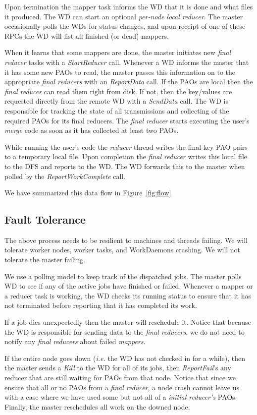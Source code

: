 \documentclass[10pt,letter,final,article,twocolumn]{article} %
\newcommand{\rpc}[1]{\emph{#1}}
\begin{document}
Upon termination the mapper task informs the WD that it is done and what files it produced. The WD can start an optional \emph{per-node local reducer}. The master occasionally polls the WDs for status changes, and upon receipt of one of these RPCs the WD will list all finished (or dead) mappers. 

When it learns that some mappers are done, the master initiates new \emph{final reducer} tasks with a \rpc{StartReducer} call. Whenever a WD informs the master that it has some new PAOs to read, the master passes this information on to the appropriate \emph{final reducers} with an \rpc{ReportData} call. If the PAOs  are local then the \emph{final reducer} can read them right from disk. If not, then the key/values are requested directly from the remote WD with a \rpc{SendData} call. The WD is responsible for tracking the state of all transmissions and collecting of the required PAOs for its final reducers. The \emph{final reducer} starts executing the user's \emph{merge} code as soon as it has collected at least two PAOs.

While running the user's code the \emph{reducer} thread writes the final key-PAO pairs to a temporary local file. Upon completion the \emph{final reducer} writes this local file to the DFS and reports to the WD. The WD forwards this to the master when polled by the \rpc{ReportWorkComplete} call.

We have summarized this data flow in Figure~\ref{fig:flow}

\subsection{Fault Tolerance}
The above process needs to be resilient to machines and threads failing. We will tolerate worker nodes, worker tasks, and WorkDaemons crashing. We will not tolerate the master failing.

We use a polling model to keep track of the dispatched jobs. The master polls WD to see if any of the active jobs have finished or failed. Whenever a mapper or a reducer task is working, the WD checks its running status to ensure that it has not terminated before reporting that it has completed its work.

If a job dies unexpectedly then the master will reschedule it. Notice that because the WD is responsible for sending data to the \emph{final reducers}, we do not need to notify any \emph{final reducers} about failed \emph{mappers}. 

If the entire node goes down (\textit{i.e.} the WD has not checked in for a while), then the master sends a \rpc{Kill} to the WD for all of its jobs, then \rpc{ReportFail}'s any reducer that are still waiting for PAOs from that node. Notice that since we ensure that all or no PAOs from a \emph{final reducer}, a node crash cannot leave us with a case where we have used some but not all of a \emph{initial reducer's} PAOs. Finally, the master reschedules all work on the downed node.
\end{document}
